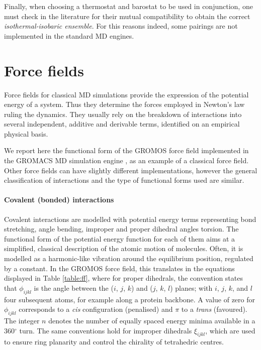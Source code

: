 Finally, when choosing a thermostat and barostat to  be used in conjunction, one must check in the literature for their mutual compatibility to obtain the correct \emph{isothermal-isobaric ensemble}. For this reasons indeed, some pairings are not implemented in the standard MD engines.


\section{Force fields}

Force fields for classical MD simulations provide the expression of the potential energy of a system. Thus they determine the forces employed in Newton's law ruling the dynamics.
%
They usually rely on the breakdown of interactions into several independent, additive and derivable terms, identified on an empirical physical basis.

We report here the functional form of the GROMOS force field \citep{Oostenbrink2004,Schmid2011,Reif2012} implemented in the GROMACS MD simulation engine \citep{Berendsen1995,Abraham2015,gromacs_man}, as an example of a classical force field.
%
Other force fields can have slightly different implementations, however the general classification of interactions and the type of functional forms used are similar.

\paragraph{Covalent (bonded) interactions} Covalent interactions are modelled with potential energy terms representing bond stretching, angle bending, improper and proper dihedral angles torsion. 
%
The functional form of the potential energy function for each of them aims at a simplified, classical description of the atomic motion of molecules. Often, it is modelled as a harmonic-like vibration around the equilibrium position, regulated by a constant.
%
In the GROMOS force field, this translates in the equations displayed in Table \ref{table:ff}, where for proper dihedrals, the convention states that $\phi_{ijkl}$ is the angle between the ($i$, $j$, $k$) and ($j$, $k$, $l$) planes; with $i$, $j$, $k$, and $l$ four subsequent atoms, for example along a protein backbone. A value of zero for $\phi_{ijkl}$ corresponds to a \textit{cis} configuration (penalised) and $\pi$ to a \emph{trans} (favoured). The integer $n$ denotes the number of equally spaced energy minima available in a 360$^\circ$ turn.
%
The same conventions hold for improper dihedrals $\xi_{ijkl}$, which are used to ensure ring planarity and control the chirality of tetrahedric centres.

